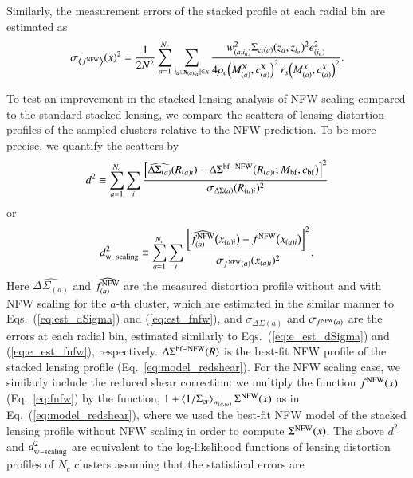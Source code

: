 \documentclass[iop, apj]{emulateapj}
\def\ave#1{\left\langle #1 \right\rangle}
\newcommand{\?}{\stackrel{?}{=}}
\begin{document}
Similarly, the measurement errors of the stacked profile at each radial
bin are estimated as
%
\begin{equation}
\sigma_{\ave{f^{\rm NFW}}}(x)^2=\frac{1}{2N^2}
   \sum_{a=1}^{N_c}\sum_{i_a; |{\bf x}_{(a)i_a}|\in x} \frac{w_{(a,i_a)}^2\Sigma_{{\rm
   cr}(a)}(z_a,z_{i_a})^2e_{(i_a)}^2}
   {4\rho_{c}\!\left(M^{\rm X}_{(a)},c^{\rm X}_{(a)}\right)^2
   r_s\!\left(M^X_{(a)},c^X_{(a)}\right)^2}.
\label{eq:e_est_fnfw}
\end{equation}
%


To test an improvement in the stacked lensing analysis of NFW scaling
compared to the standard stacked lensing, we compare the scatters of
lensing distortion profiles of the sampled clusters relative to the NFW
prediction. To be more precise, we quantify the scatters by
%
\begin{equation}
 d^2\equiv \sum_{a=1}^{N_c}\sum_{i}
\frac{\left[
\widehat{\Delta\Sigma_{(a)}}(R_{(a)i})
-\Delta\Sigma^{\rm bf-NFW}\!\left(R_{(a)i};M_{\rm bf}, c_{\rm bf}\right)\right]^2}
{\sigma_{\Delta\Sigma(a)}(R_{(a)i})^2}
\label{eq:d}
\end{equation}
%
or
%
\begin{equation}
 d^2_{\rm w-scaling}\equiv \sum_{a=1}^{N_c}\sum_{i}
\frac{\left[
\widehat{f^{\rm NFW}_{(a)}}\!\left(x_{(a)i}\right)-f^{\rm
NFW}\!\left(x_{(a)i}\right)\right]^2}{\sigma_{f^{\rm NFW}(a)}(x_{(a)i})^2}.
\label{eq:d_nfw}
\end{equation}
%
Here $\widehat{\Delta\Sigma_{(a)}}$ and $\widehat{f^{\rm NFW}_{(a)}}$
are the measured distortion profile without and with NFW scaling for the
$a$-th cluster, which are estimated in the similar manner to
Eqs.~(\ref{eq:est_dSigma}) and (\ref{eq:est_fnfw}), and $\sigma_{\Delta
\Sigma (a)}$ and $\sigma_{f^{\rm NFW}(a)}$ are the errors at each radial
bin, estimated similarly to Eqs.~(\ref{eq:e_est_dSigma}) and
(\ref{eq:e_est_fnfw}), respectively.  $\Delta\Sigma^{\rm bf-NFW}(R)$ is
the best-fit NFW profile of the stacked lensing profile
(Eq.~\ref{eq:model_redshear}). For the NFW scaling case, we similarly
include the reduced shear correction: we multiply the function $f^{\rm
NFW}(x)$ (Eq.~\ref{eq:fnfw}) by the function, $1+\ave{1/\Sigma_{\rm
cr}}_{w_{(a,i_a)}}\Sigma^{\rm NFW}(x)$ as in
Eq.~(\ref{eq:model_redshear}), where we used the best-fit NFW model of
the stacked lensing profile without NFW scaling in order to compute
$\Sigma^{\rm NFW}(x)$. The above $d^2$ and $d^2_{\rm w-scaling}$ are
equivalent to the log-likelihood functions of lensing distortion
profiles of $N_c$ clusters assuming that the statistical errors are
\end{document}
